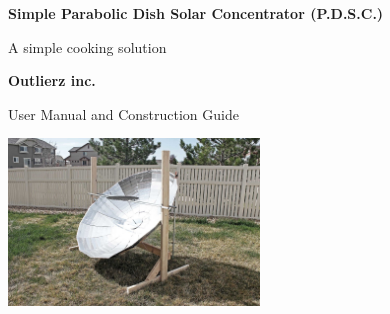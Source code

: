 \documentclass[titlepage]{article}
\begin{document}
    \begin{titlepage}
        \begin{center}
            \vspace*{1cm}
    
            \Huge
            \textbf{Simple Parabolic Dish Solar Concentrator (P.D.S.C.)}
    
            \vspace{0.5cm}
            \LARGE
            A simple cooking solution
    
            \vspace{1.5cm}
    
            \textbf{Outlierz inc.}
    
            \vspace{3.5cm}
    
            User Manual and Construction Guide
    
            \vspace{0.8cm}
    
            \includegraphics[width=0.5\textwidth]{finished_cooker}

        \end{center}
    \end{titlepage}  
        
    
    \tableofcontents
    \newpage
    \listoffigures
    \newpage
\end{document}
